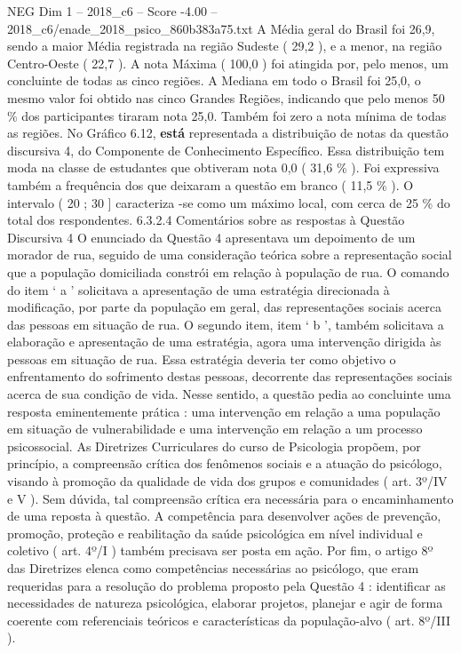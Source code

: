 \begin{textsample}{NEG Dim 1 – 2018\_c6 – Score -4.00 – 2018\_c6/enade\_2018\_psico\_860b383a75.txt}
A Média geral do Brasil foi 26,9, sendo a maior Média registrada na região Sudeste ( 29,2 ), e a menor, na região Centro-Oeste ( 22,7 ).
A nota Máxima ( 100,0 ) foi atingida por, pelo menos, um concluinte de todas as cinco regiões.
A Mediana em todo o Brasil foi 25,0, o mesmo valor foi obtido nas cinco Grandes Regiões, indicando que pelo menos 50 \% dos participantes tiraram nota 25,0.
Também foi zero a nota mínima de todas as regiões.
No Gráfico 6.12, \textbf{está} representada a distribuição de notas da questão discursiva 4, do Componente de Conhecimento Específico.
Essa distribuição tem moda na classe de estudantes que obtiveram nota 0,0 ( 31,6 \% ).
Foi expressiva também a frequência dos que deixaram a questão em branco ( 11,5 \% ).
O intervalo ( 20 ; 30 ] caracteriza -se como um máximo local, com cerca de 25 \% do total dos respondentes. 6.3.2.4 Comentários sobre as respostas à Questão Discursiva 4 O enunciado da Questão 4 apresentava um depoimento de um morador de rua, seguido de uma consideração teórica sobre a representação social que a população domiciliada constrói em relação à população de rua.
O comando do item ‘ a ’ solicitava a apresentação de uma estratégia direcionada à modificação, por parte da população em geral, das representações sociais acerca das pessoas em situação de rua.
O segundo item, item ‘ b ’, também solicitava a elaboração e apresentação de uma estratégia, agora uma intervenção dirigida às pessoas em situação de rua.
Essa estratégia deveria ter como objetivo o enfrentamento do sofrimento destas pessoas, decorrente das representações sociais acerca de sua condição de vida.
Nesse sentido, a questão pedia ao concluinte uma resposta eminentemente prática : uma intervenção em relação a uma população em situação de vulnerabilidade e uma intervenção em relação a um processo psicossocial.
As Diretrizes Curriculares do curso de Psicologia propõem, por princípio, a compreensão crítica dos fenômenos sociais e a atuação do psicólogo, visando à promoção da qualidade de vida dos grupos e comunidades ( art. 3º/IV e V ).
Sem dúvida, tal compreensão crítica era necessária para o encaminhamento de uma reposta à questão.
A competência para desenvolver ações de prevenção, promoção, proteção e reabilitação da saúde psicológica em nível individual e coletivo ( art. 4º/I ) também precisava ser posta em ação.
Por fim, o artigo 8º das Diretrizes elenca como competências necessárias ao psicólogo, que eram requeridas para a resolução do problema proposto pela Questão 4 : identificar as necessidades de natureza psicológica, elaborar projetos, planejar e agir de forma coerente com referenciais teóricos e características da população-alvo ( art. 8º/III ).

\end{textsample}
